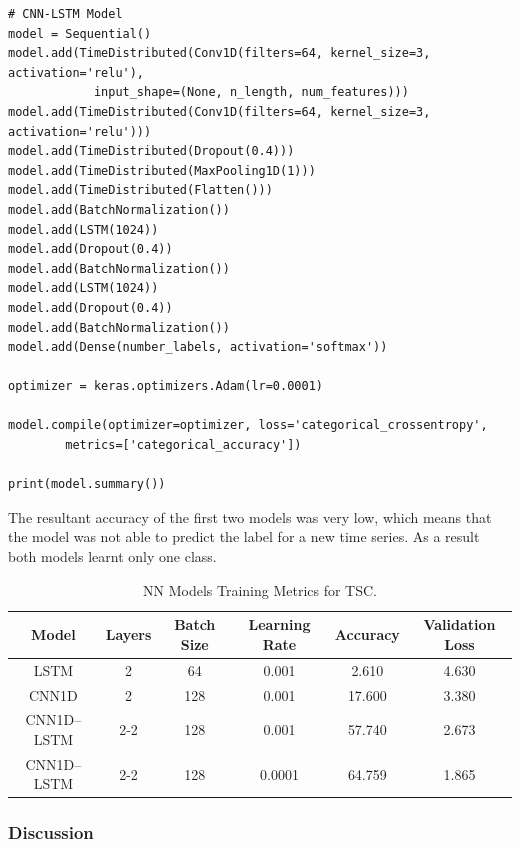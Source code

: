 \lstset{language=Python}
\lstset{frame=lines}
\lstset{basicstyle=\footnotesize}
\begin{lstlisting}
# CNN-LSTM Model
model = Sequential()
model.add(TimeDistributed(Conv1D(filters=64, kernel_size=3, activation='relu'), 
			input_shape=(None, n_length, num_features)))
model.add(TimeDistributed(Conv1D(filters=64, kernel_size=3, activation='relu')))
model.add(TimeDistributed(Dropout(0.4)))
model.add(TimeDistributed(MaxPooling1D(1)))
model.add(TimeDistributed(Flatten()))
model.add(BatchNormalization())
model.add(LSTM(1024))
model.add(Dropout(0.4))
model.add(BatchNormalization())
model.add(LSTM(1024))
model.add(Dropout(0.4))
model.add(BatchNormalization())
model.add(Dense(number_labels, activation='softmax'))

optimizer = keras.optimizers.Adam(lr=0.0001)

model.compile(optimizer=optimizer, loss='categorical_crossentropy', 
		metrics=['categorical_accuracy'])

print(model.summary())
\end{lstlisting}

The resultant accuracy of the first two models was very low, which means that the model was not able to predict the label for a new time series. As a result both models learnt only one class.

\begin{table}[h]
	\centering
	\tiny
	\begin{tabular}{|c|c|c|c|c|c|}
		\hline
		Model        & Layers & Batch Size & Learning Rate & Accuracy & Validation Loss \\ \hline
		LSTM         & 2      &  64        & 0.001         &  2.610   & 4.630           \\
		CNN1D        & 2      & 128        & 0.001         & 17.600   & 3.380           \\
		CNN1D--LSTM  & 2-2    & 128        & 0.001         & 57.740   & 2.673           \\ 		
		CNN1D--LSTM  & 2-2    & 128        & 0.0001		   & 64.759   & 1.865           \\ \hline		
	\end{tabular}
\caption{NN Models Training Metrics for TSC.}
\label{Table:DLModels}
\end{table}

\subsubsection{Discussion}


